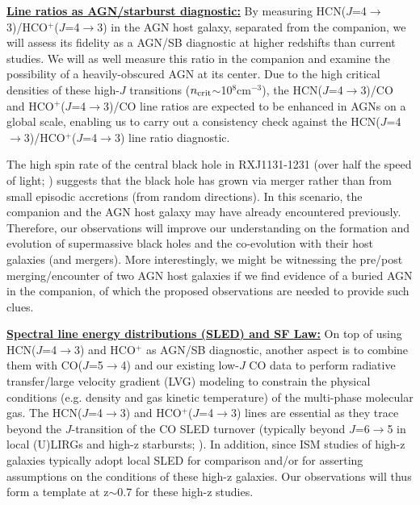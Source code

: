 \documentclass[12pt,a4paper]{article}  %
\newcommand{\ncrit}{\mbox{$n_{\rm crit}$}\xspace}
\newcommand{\rarr}{$\rightarrow$}
\newcommand{\eco}{\mbox{CO($J$=5\rarr4)}\xspace}
\newcommand{\dhcn}{HCN($J$=4\rarr3)\xspace}
\newcommand{\hcop}{HCO$^+$\xspace}
\newcommand{\dhcop}{HCO$^+$($J$=4\rarr3)\xspace}
\begin{document}
\underline{\bf Line ratios as AGN/starburst diagnostic:}
By measuring \dhcn/\dhcop in the 
AGN host galaxy, separated from the companion, we will assess its fidelity as a 
AGN/SB diagnostic at higher redshifts than current studies. 
We will as well measure this ratio in the companion and examine the possibility of a 
heavily-obscured AGN at its center. 
Due to the high critical densities of these high-$J$ transitions (\ncrit$\sim$10$^{8}$cm$^{-3}$), 
the \dhcn/CO and \dhcop/CO line ratios are expected to 
be enhanced in AGNs on a global scale, enabling us to carry out a consistency check against the
\dhcn/\dhcop line ratio diagnostic.

The high spin rate of the central black hole in RXJ1131-1231 (over half the speed of light; \citealt{Reis14a})
suggests that the black hole has grown via merger
rather than from small episodic accretions (from random directions).
In this scenario, the companion and the AGN host galaxy may have already encountered previously.
Therefore, our observations will improve our understanding 
on the formation and evolution of supermassive black holes
and the co-evolution with their host galaxies (and mergers).
More interestingly, we might be witnessing the 
pre/post merging/encounter of two AGN host galaxies if we find evidence of a buried AGN in the companion, 
of which the proposed observations are needed to provide such clues.

\underline{\bf Spectral line energy distributions (SLED) and SF Law:}
On top of using \dhcn and \hcop as AGN/SB diagnostic, another 
 aspect 
 is to 
combine them with \eco %
and our existing low-$J$ CO data to perform radiative transfer/large velocity gradient (LVG) modeling 
to constrain the physical conditions 
(e.g. density and gas kinetic temperature) of the multi-phase molecular gas.
The \dhcn and \dhcop lines are essential as they trace beyond the $J$-transition of the CO SLED turnover
(typically beyond $J$=6\rarr5 in local (U)LIRGs and high-z starbursts; \citealt{Greve14a}).
In addition, since ISM studies of high-z galaxies typically adopt local SLED for comparison \citep[e.g.][]{Bothwell13a}
and/or for asserting assumptions on the conditions of these high-z galaxies.
Our observations will thus form a template at z$\sim$0.7 
for these high-z studies.
\end{document}
